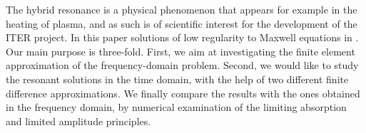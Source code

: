 The hybrid resonance is a physical phenomenon
that appears for example in the heating of plasma,
and as such is of scientific interest for the development  of  the ITER project.
In this paper  solutions of low regularity to Maxwell equations in
. 
Our main purpose is three-fold. First, we aim at investigating the finite element approximation 
of the frequency-domain problem. Second, we would like to study the resonant solutions 
in the time domain, with the help of two different finite difference approximations. 
We finally  compare the results with the ones obtained in the frequency domain, by  
numerical examination of the limiting absorption and limited amplitude principles. 